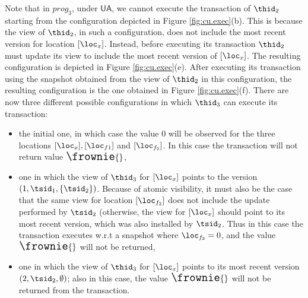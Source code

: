 Note that in $prog_3$, under $\mathsf{UA}$, 
we cannot execute the transaction of $\thid_2$ starting from 
the configuration depicted in Figure \ref{fig:cu.exec}(b). This 
is because the view of $\thid_2$, in such a configuration, does 
not include the most recent version for location $[\loc_x]$. 
Instead, before executing its transaction $\thid_2$ must update 
its view to include the most recent version of $[\loc_x]$. The 
resulting configuration is depicted in Figure \ref{fig:cu.exec}(e). 
After executing its transaction using the snapshot obtained 
from the view of $\thid_2$ in this configuration, the resulting 
configuration is the one obtained in Figure \ref{fig:cu.exec}(f). 
There are now three different possible configurations in which 
$\thid_3$ can execute its transaction: 
\begin{itemize}
\item the initial one, in which case the value $0$ will be observed 
for the three locations $[\loc_x], [\loc_{f1}]$ and $[\loc_{f_2}]$. 
In this case the transaction will not return value ${\Large \frownie{}}$, 
\item one in which the view of $\thid_3$ for $[\loc_x]$ points to the 
version $(1, \tsid_1, \{\tsid_2\})$. Because of atomic visibility, 
it must also be the case that the same view for location $[\loc_{f_2}]$ 
does not include the update performed by $\tsid_2$ (otherwise, 
the view for $[\loc_x]$ should point to its most recent version, which 
was also installed by $\tsid_2$. Thus in this case the transaction executes 
w.r.t a snapshot where $\loc_{f_2} = 0$, and the value ${\Large \frownie{}}$ 
will not be returned, 
\item one in which the view of $\thid_3$ for $[\loc_x]$ points to 
its most recent version $(2, \tsid_2, \emptyset)$; also in this case, 
the value ${\Large \frownie{}}$ will not be returned from the transaction.
\end{itemize}

